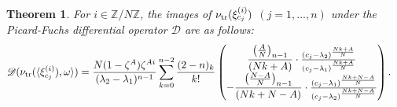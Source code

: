 \documentclass[letterpaper, 11pt]{amsart}
\theoremstyle{my theoremstyle}
\newtheorem{thm}{Theorem}[section]
\theoremstyle{dfn}
\theoremstyle{remark}
\renewcommand{\1}{\mathbbm{1}}
\newcommand{\Z}{\mathbb{Z}}
\renewcommand{\l}{\lambda}
\numberwithin{equation}{section}
\begin{document}
\begin{thm} \label{main:1}
For $i \in \Z/N\Z$, the images of $\nu_{\rm tr}(\xi_{c_j}^{(i)})$ $(j=1, \ldots, n)$ under the Picard-Fuchs differential operator $\mathscr{D}$ are as follows: 
\begin{align*}
&\mathscr{D}(\nu_{\rm tr}(\langle \xi_{c_j}^{(i)}), \omega \rangle)= 
\frac{N(1-\zeta^A)\zeta^{Ai}}{(\l_2-\l_1)^{n-1}}
\sum_{k=0}^{n-2}
\dfrac{(2-n)_k}{k!}
\begin{pmatrix}
  \dfrac{\left(\frac{A}{N} \right)_{n-1}}{(Nk+A)} \cdot
 \frac{(c_j-\l_2)^{\frac{Nk+A}{N}}}{(c_j-\l_1)^{\frac{Nk+A}{N}}}\\
- 
  \dfrac{\left(\frac{N-A}N\right)_{n-1}}{(Nk+N-A)} \cdot \frac{(c_j-\l_1)^{\frac{Nk+N-A}{N}}}{(c_j-\l_2)^{\frac{Nk+N-A}{N}}}
\end{pmatrix}. 
\end{align*}
\end{thm}
\end{document}
